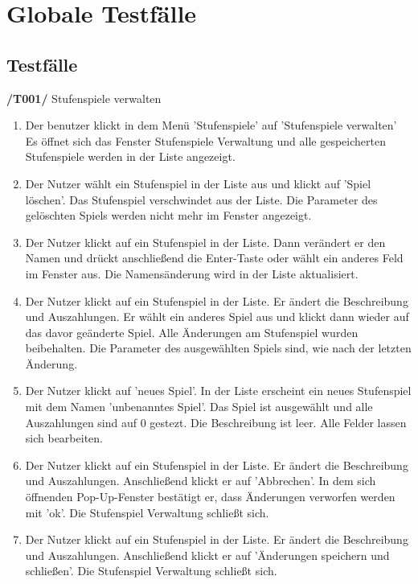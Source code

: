 
\section{Globale Testfälle}

\subsection{Testfälle}

\textbf{/T001/} Stufenspiele verwalten
\begin{enumerate}

\item {}
{Der benutzer klickt in dem Menü 'Stufenspiele' auf 'Stufenspiele verwalten'}
{Es öffnet sich das Fenster Stufenspiele Verwaltung und alle gespeicherten Stufenspiele werden in der Liste angezeigt.}

\item {}
{Der Nutzer wählt ein Stufenspiel in der Liste aus und klickt auf 'Spiel löschen'.}
{Das Stufenspiel verschwindet aus der Liste. Die Parameter des gelöschten Spiels werden nicht mehr im Fenster angezeigt.}

\item {}
{Der Nutzer klickt auf ein Stufenspiel in der Liste. Dann verändert er den Namen und drückt anschließend die Enter-Taste oder wählt ein anderes Feld im Fenster aus.}
{Die Namensänderung wird in der Liste aktualisiert. }

\item {}
{Der Nutzer klickt auf ein Stufenspiel in der Liste. Er ändert die Beschreibung und Auszahlungen. Er wählt ein anderes Spiel aus und klickt dann wieder auf das davor geänderte Spiel.}
{Alle Änderungen am Stufenspiel wurden beibehalten. Die Parameter des ausgewählten Spiels sind, wie nach der letzten Änderung.}

\item {}
{Der Nutzer klickt auf 'neues Spiel'.}
{In der Liste erscheint ein neues Stufenspiel mit dem Namen 'unbenanntes Spiel'. Das Spiel ist ausgewählt und alle Auszahlungen sind auf 0 gestezt. Die Beschreibung ist leer. Alle Felder lassen sich bearbeiten.}

\item {}
{Der Nutzer klickt auf ein Stufenspiel in der Liste. Er ändert die Beschreibung und Auszahlungen. Anschließend klickt er auf 'Abbrechen'. In dem sich öffnenden Pop-Up-Fenster bestätigt er, dass Änderungen verworfen werden mit 'ok'.}
{Die Stufenspiel Verwaltung schließt sich.}

\item {}
{Der Nutzer klickt auf ein Stufenspiel in der Liste. Er ändert die Beschreibung und Auszahlungen. Anschließend klickt er auf 'Änderungen speichern und schließen'.}
{Die Stufenspiel Verwaltung schließt sich.}


\end{enumerate}


